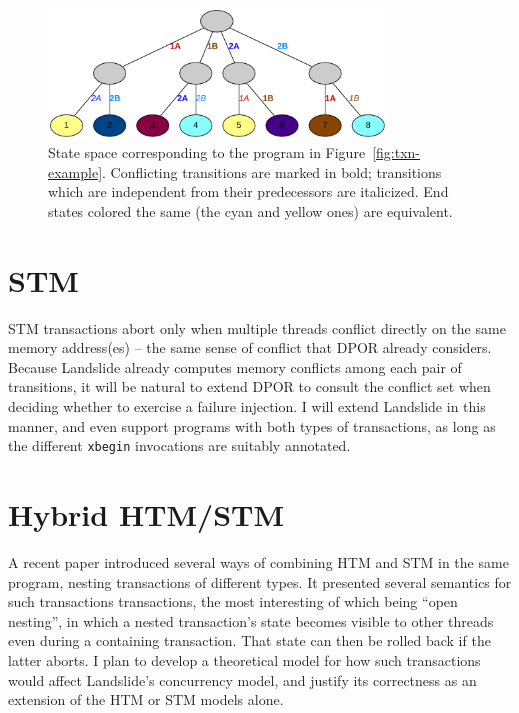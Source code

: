\begin{figure}[t]
	\begin{center}
		\includegraphics[width=0.8\textwidth]{htm-graph.pdf}
	\end{center}
	\caption{State space corresponding to the program in Figure~\ref{fig:txn-example}.
	Conflicting transitions are marked in bold;
	transitions which are independent from their predecessors are italicized.
	End states colored the same (the cyan and yellow ones) are equivalent.
	}
	\label{fig:txn-graph}
\end{figure}

\section{STM}

STM transactions abort only when multiple threads conflict directly on the same memory address(es) -- the same sense of conflict that DPOR already considers.
Because Landslide already computes memory conflicts among each pair of transitions, it will be natural to extend DPOR to consult the conflict set when deciding whether to exercise a failure injection.
I will extend Landslide in this manner, and even support programs with both types of transactions, as long as the different {\tt xbegin} invocations are suitably annotated.

\section{Hybrid HTM/STM}

A recent paper \cite{hybrid-htm-stm} introduced several ways of combining HTM and STM in the same program, nesting transactions of different types.
It presented several semantics for such transactions transactions, the most interesting of which being ``open nesting'', in which a nested transaction's state becomes visible to other threads even during a containing transaction.
That state can then be rolled back if the latter aborts.
I plan to develop a theoretical model for how such transactions would affect Landslide's concurrency model,
and justify its correctness as an extension of the HTM or STM models alone.

